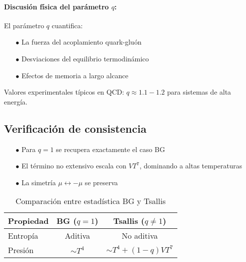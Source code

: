 \paragraph{Discusión física del parámetro $q$:}
El parámetro $q$ cuantifica:
\begin{itemize}
    \item[$\bullet$] La fuerza del acoplamiento quark-gluón
    \item[$\bullet$] Desviaciones del equilibrio termodinámico
    \item[$\bullet$] Efectos de memoria a largo alcance
    
\end{itemize}
Valores experimentales típicos en QCD: $q \approx 1.1 - 1.2$ para sistemas de alta energía.%

\subsection*{Verificación de consistencia}
\begin{itemize}
    \item[$\bullet$] Para $q=1$ se recupera exactamente el caso BG
    \item[$\bullet$] El término no extensivo escala con $V T^7$, dominando a altas temperaturas
    \item[$\bullet$] La simetría $\mu \leftrightarrow -\mu$ se preserva
\end{itemize}

\begin{table}[h]
    \centering
    \caption{Comparación entre estadística BG y Tsallis}
    \begin{tabular}{lcc}
    \toprule
    \textbf{Propiedad} & \textbf{BG ($q=1$)} & \textbf{Tsallis ($q\neq1$)} \\
    \midrule
    Entropía & Aditiva & No aditiva \\
    Presión & $\sim T^4$ & $\sim T^4 + (1-q)V T^7$ \\
    \bottomrule
    \end{tabular}
    \label{tab:BG-vs-Tsallis}
\end{table}
    
